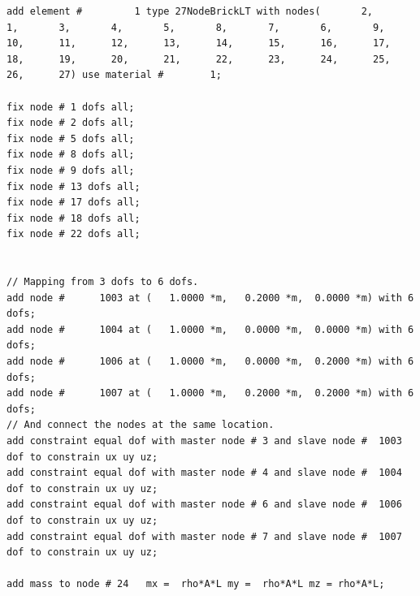 \documentclass[fleqn,11pt]{article}
\begin{document}
\begin{lstlisting}
add element #         1 type 27NodeBrickLT with nodes(       2,       1,       3,       4,       5,       8,       7,       6,       9,      10,      11,      12,      13,      14,      15,      16,      17,      18,      19,      20,      21,      22,      23,      24,      25,      26,      27) use material #        1; 

fix node # 1 dofs all;
fix node # 2 dofs all;
fix node # 5 dofs all;
fix node # 8 dofs all;
fix node # 9 dofs all;
fix node # 13 dofs all;
fix node # 17 dofs all;
fix node # 18 dofs all;
fix node # 22 dofs all;


// Mapping from 3 dofs to 6 dofs. 
add node #      1003 at (   1.0000 *m,   0.2000 *m,  0.0000 *m) with 6 dofs;
add node #      1004 at (   1.0000 *m,   0.0000 *m,  0.0000 *m) with 6 dofs;
add node #      1006 at (   1.0000 *m,   0.0000 *m,  0.2000 *m) with 6 dofs;
add node #      1007 at (   1.0000 *m,   0.2000 *m,  0.2000 *m) with 6 dofs;
// And connect the nodes at the same location.
add constraint equal dof with master node # 3 and slave node #  1003 dof to constrain ux uy uz;
add constraint equal dof with master node # 4 and slave node #  1004 dof to constrain ux uy uz;
add constraint equal dof with master node # 6 and slave node #  1006 dof to constrain ux uy uz;
add constraint equal dof with master node # 7 and slave node #  1007 dof to constrain ux uy uz;

add mass to node # 24   mx =  rho*A*L my =  rho*A*L mz = rho*A*L;


\end{lstlisting}
\end{document}
